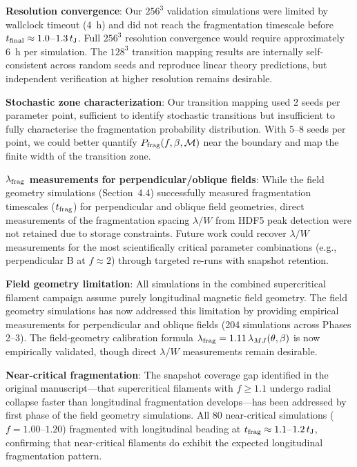 \documentclass[twoside,twocolumn]{mnras}
\begin{document}
\textbf{Resolution convergence}: Our $256^3$ validation simulations were limited by wallclock timeout (4~h) and did not reach the fragmentation timescale before $t_{\rm final} \approx 1.0$--$1.3\,t_{\rm J}$. Full $256^3$ resolution convergence would require approximately 6~h per simulation. The $128^3$ transition mapping results are internally self-consistent across random seeds and reproduce linear theory predictions, but independent verification at higher resolution remains desirable.

\textbf{Stochastic zone characterization}: Our transition mapping used 2 seeds per parameter point, sufficient to identify stochastic transitions but insufficient to fully characterise the fragmentation probability distribution. With 5--8 seeds per point, we could better quantify $P_{\rm frag}(f, \beta, \mathcal{M})$ near the boundary and map the finite width of the transition zone.

\textbf{$\lambda_{\rm frag}$ measurements for perpendicular/oblique fields}: While the field geometry simulations (Section~4.4) successfully measured fragmentation timescales ($t_{\rm frag}$) for perpendicular and oblique field geometries, direct measurements of the fragmentation spacing $\lambda/W$ from HDF5 peak detection were not retained due to storage constraints. Future work could recover $\lambda/W$ measurements for the most scientifically critical parameter combinations (e.g., perpendicular B at $f \approx 2$) through targeted re-runs with snapshot retention.

\textbf{Field geometry limitation}: All simulations in the combined supercritical filament campaign assume purely longitudinal magnetic field geometry. The field geometry simulations has now addressed this limitation by providing empirical measurements for perpendicular and oblique fields (204 simulations across Phases 2--3). The field-geometry calibration formula $\lambda_{\rm frag} = 1.11\,\lambda_{MJ}(\theta, \beta)$ is now empirically validated, though direct $\lambda/W$ measurements remain desirable.

\textbf{Near-critical fragmentation}: The snapshot coverage gap identified in the original manuscript---that supercritical filaments with $f \geq 1.1$ undergo radial collapse faster than longitudinal fragmentation develops---has been addressed by first phase of the field geometry simulations. All 80 near-critical simulations ($f = 1.00$--$1.20$) fragmented with longitudinal beading at $t_{\rm frag} \approx 1.1$--$1.2\,t_{\rm J}$, confirming that near-critical filaments do exhibit the expected longitudinal fragmentation pattern.
\end{document}
